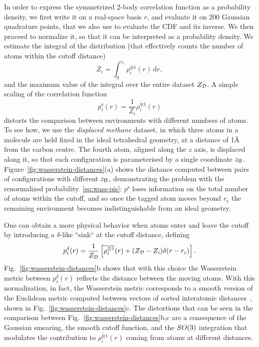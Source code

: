 In order to express the symmetrized 2-body correlation function as a probability density, we first write it on a real-space basis $r$, and evaluate it on 200 Gaussian quadrature points, that we also use to evaluate the CDF and its inverse. 
We then proceed to normalize it, so that it can be interpreted as a probability density.
We estimate the integral of the distribution (that effectively counts the number of atoms within the cutoff distance) 
\begin{equation}
Z_i = \int_0^{r_c} \overline{\rho_i^{\otimes 1}}(r)\,\mathrm{d}r,
\end{equation}
and the maximum value of the integral over the entire dataset $Z_{\mathcal{D}}$.
A simple scaling of the correlation function 
\begin{equation}
p_i^{\text{s}}(r) = \frac1{Z_i} \overline{\rho_i^{\otimes 1}}(r)\label{eq:wass-pis}
\end{equation}
distorts the comparison between environments with different numbers of atoms.
To see how, we use the \emph{displaced methane} dataset, in which three atoms in a  molecule are held fixed in the ideal tetrahedral geometry, at a distance of 1\AA{} from the carbon centre. The fourth atom, aligned along the $z$ axis, is displaced along it, so that each configuration is parameterised by a single coordinate $\zh$.
Figure~\ref{fig:wasserstein-distances}(a) shows the distance computed between pairs of configurations with different $\zh$,  demonstrating the problem with the renormalized probability~\eqref{eq:wass-pis}: $p^{\text{s}}$ loses information on the total number of atoms within the cutoff, and so once the tagged atom moves beyond $r_\text{c}$ the remaining  environment becomes indistinguishable from an ideal  geometry. 

One can obtain a more physical behavior when atoms enter and leave the cutoff by introducing a $\delta$-like ``sink`` at the cutoff distance, defining
\begin{equation}
p^{\delta}_i(r) = \frac{1}{Z_{\mathcal{D}}}\left[\overline{\rho_i^{\otimes 1}}(r) + (Z_{\mathcal{D}}-Z_i)\delta(r-r_c)\right].
\end{equation}
Fig.~\ref{fig:wasserstein-distances}b shows that with this choice the Wasserstein metric between $p_i^\delta(r)$ reflects the distance between the moving atoms. With this normalization, in fact, the Wasserstein metric corresponds to a smooth version of the Euclidean metric computed between vectors of sorted interatomic distances~\cite{will+19jcp}, shown in Fig.~\ref{fig:wasserstein-distances}c. 
The distortions that can be seen in the comparison between Fig.~\ref{fig:wasserstein-distances}b,c are a consequence of the Gaussian smearing, the smooth cutoff function, and the ${SO(3)}$ integration that modulates the contribution to $\overline{\rho_i^{\otimes 1}}(r)$ coming from atoms at different distances.

